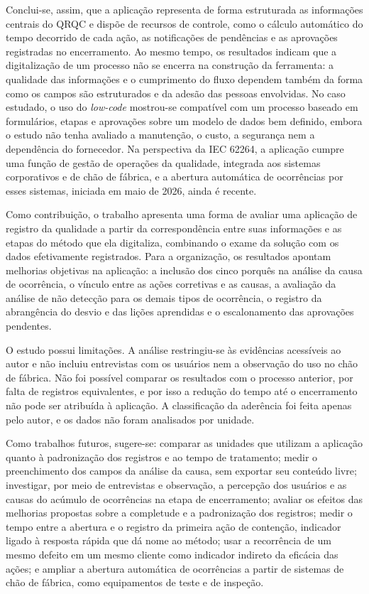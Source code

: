 Conclui-se, assim, que a aplicação representa de forma estruturada as informações centrais do QRQC e dispõe de recursos de controle, como o cálculo automático do tempo decorrido de cada ação, as notificações de pendências e as aprovações registradas no encerramento. Ao mesmo tempo, os resultados indicam que a digitalização de um processo não se encerra na construção da ferramenta: a qualidade das informações e o cumprimento do fluxo dependem também da forma como os campos são estruturados e da adesão das pessoas envolvidas. No caso estudado, o uso do \textit{low-code} mostrou-se compatível com um processo baseado em formulários, etapas e aprovações sobre um modelo de dados bem definido, embora o estudo não tenha avaliado a manutenção, o custo, a segurança nem a dependência do fornecedor. Na perspectiva da IEC 62264, a aplicação cumpre uma função de gestão de operações da qualidade, integrada aos sistemas corporativos e de chão de fábrica, e a abertura automática de ocorrências por esses sistemas, iniciada em maio de 2026, ainda é recente.

Como contribuição, o trabalho apresenta uma forma de avaliar uma aplicação de registro da qualidade a partir da correspondência entre suas informações e as etapas do método que ela digitaliza, combinando o exame da solução com os dados efetivamente registrados. Para a organização, os resultados apontam melhorias objetivas na aplicação: a inclusão dos cinco porquês na análise da causa de ocorrência, o vínculo entre as ações corretivas e as causas, a avaliação da análise de não detecção para os demais tipos de ocorrência, o registro da abrangência do desvio e das lições aprendidas e o escalonamento das aprovações pendentes.

O estudo possui limitações. A análise restringiu-se às evidências acessíveis ao autor e não incluiu entrevistas com os usuários nem a observação do uso no chão de fábrica. Não foi possível comparar os resultados com o processo anterior, por falta de registros equivalentes, e por isso a redução do tempo até o encerramento não pode ser atribuída à aplicação. A classificação da aderência foi feita apenas pelo autor, e os dados não foram analisados por unidade.

Como trabalhos futuros, sugere-se: comparar as unidades que utilizam a aplicação quanto à padronização dos registros e ao tempo de tratamento; medir o preenchimento dos campos da análise da causa, sem exportar seu conteúdo livre; investigar, por meio de entrevistas e observação, a percepção dos usuários e as causas do acúmulo de ocorrências na etapa de encerramento; avaliar os efeitos das melhorias propostas sobre a completude e a padronização dos registros; medir o tempo entre a abertura e o registro da primeira ação de contenção, indicador ligado à resposta rápida que dá nome ao método; usar a recorrência de um mesmo defeito em um mesmo cliente como indicador indireto da eficácia das ações; e ampliar a abertura automática de ocorrências a partir de sistemas de chão de fábrica, como equipamentos de teste e de inspeção.
